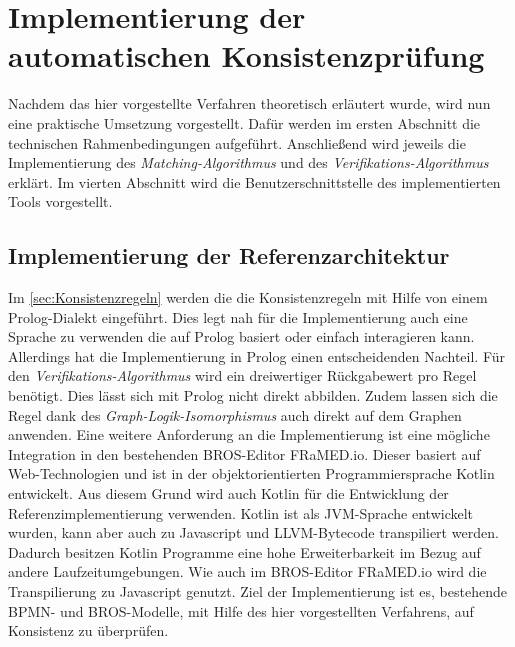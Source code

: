 \chapter{Implementierung der automatischen Konsistenzprüfung}

Nachdem das hier vorgestellte Verfahren theoretisch erläutert wurde, wird nun eine praktische Umsetzung vorgestellt.
Dafür werden im ersten Abschnitt die technischen Rahmenbedingungen aufgeführt.
Anschließend wird jeweils die Implementierung des \emph{Matching-Algorithmus} und des \emph{Verifikations-Algorithmus} erklärt.
Im vierten Abschnitt wird die Benutzerschnittstelle des implementierten Tools vorgestellt.

\section{Implementierung der Referenzarchitektur}

Im \cref{sec:Konsistenzregeln} werden die die Konsistenzregeln mit Hilfe von einem Prolog-Dialekt eingeführt.
Dies legt nah für die Implementierung auch eine Sprache zu verwenden die auf Prolog basiert oder einfach interagieren kann.
Allerdings hat die Implementierung in Prolog einen entscheidenden Nachteil.
Für den \emph{Verifikations-Algorithmus} wird ein dreiwertiger Rückgabewert pro Regel benötigt.
Dies lässt sich mit Prolog nicht direkt abbilden.
Zudem lassen sich die Regel dank des \emph{Graph-Logik-Isomorphismus} auch direkt auf dem Graphen anwenden.
Eine weitere Anforderung an die Implementierung ist eine mögliche Integration in den bestehenden BROS-Editor FRaMED.io.
Dieser basiert auf Web-Technologien und ist in der objektorientierten Programmiersprache Kotlin entwickelt.
Aus diesem Grund wird auch Kotlin für die Entwicklung der Referenzimplementierung verwenden.
Kotlin ist als JVM-Sprache entwickelt wurden, kann aber auch zu Javascript und LLVM-Bytecode transpiliert werden.
Dadurch besitzen Kotlin Programme eine hohe Erweiterbarkeit im Bezug auf andere Laufzeitumgebungen.
Wie auch im BROS-Editor FRaMED.io wird die Transpilierung zu Javascript genutzt.
Ziel der Implementierung ist es, bestehende BPMN- und BROS-Modelle, mit Hilfe des hier vorgestellten Verfahrens, auf Konsistenz zu überprüfen.

